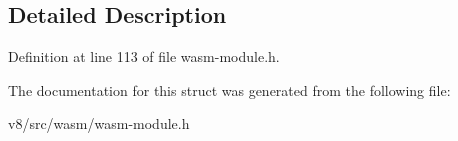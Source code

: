 \subsection{Detailed Description}


Definition at line 113 of file wasm-\/module.\+h.



The documentation for this struct was generated from the following file\+:\begin{DoxyCompactItemize}
\item 
v8/src/wasm/wasm-\/module.\+h\end{DoxyCompactItemize}
